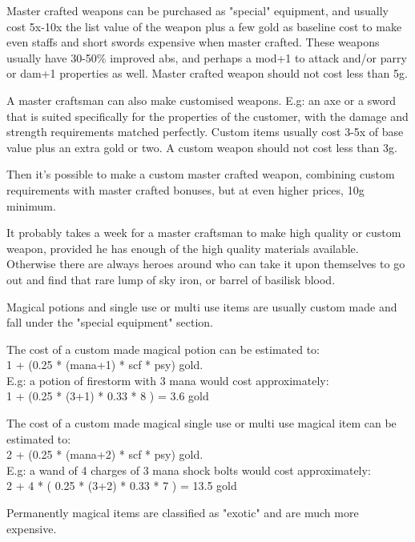 Master crafted weapons can be purchased as "special" equipment, and usually cost 5x-10x the list value of the weapon plus a few gold as baseline cost to make even staffs and short swords expensive when master crafted. These weapons usually have 30-50\% improved abs, and perhaps a mod+1 to attack and/or parry or dam+1 properties as well. Master crafted weapon should not cost less than 5g.

A master craftsman can also make customised weapons. E.g: an axe or a sword that is suited specifically for the properties of the customer, with the damage and strength requirements matched perfectly. Custom items usually cost 3-5x of base value plus an extra gold or two. A custom weapon should not cost less than 3g.

Then it's possible to make a custom master crafted weapon, combining custom requirements with master crafted bonuses, but at even higher prices, 10g minimum.

It probably takes a week for a master craftsman to make high quality or custom weapon, provided he has enough of the high quality materials available. Otherwise there are always heroes around who can take it upon themselves to go out and find that rare lump of sky iron, or barrel of basilisk blood.

Magical potions and single use or multi use items are usually custom made and fall under the "special equipment" section.

The cost of a custom made magical potion can be estimated to:\\
1 + (0.25 * (mana+1) * scf * psy) gold. \\
E.g: a potion of firestorm with 3 mana would cost approximately:\\
1 + (0.25 * (3+1) * 0.33 * 8 ) = 3.6 gold

The cost of a custom made magical single use or multi use magical item can be estimated to: \\
2 + (0.25 * (mana+2) * scf * psy) gold. \\
E.g: a wand of 4 charges of 3 mana shock bolts would cost approximately: \\
2 + 4 * ( 0.25 * (3+2) * 0.33 * 7 ) = 13.5 gold

Permanently magical items are classified as "exotic" and are much more expensive.






